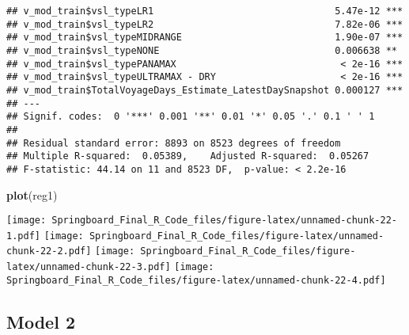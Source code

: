 \documentclass[]{article}
\newenvironment{Shaded}{\begin{snugshade}}{\end{snugshade}}
\newcommand{\KeywordTok}[1]{\textcolor[rgb]{0.13,0.29,0.53}{\textbf{#1}}}
\newcommand{\StringTok}[1]{\textcolor[rgb]{0.31,0.60,0.02}{#1}}
\newcommand{\CommentTok}[1]{\textcolor[rgb]{0.56,0.35,0.01}{\textit{#1}}}
\newcommand{\OperatorTok}[1]{\textcolor[rgb]{0.81,0.36,0.00}{\textbf{#1}}}
\newcommand{\NormalTok}[1]{#1}
\begin{document}
\begin{verbatim}
## v_mod_train$vsl_typeLR1                                5.47e-12 ***
## v_mod_train$vsl_typeLR2                                7.82e-06 ***
## v_mod_train$vsl_typeMIDRANGE                           1.90e-07 ***
## v_mod_train$vsl_typeNONE                               0.006638 ** 
## v_mod_train$vsl_typePANAMAX                             < 2e-16 ***
## v_mod_train$vsl_typeULTRAMAX - DRY                      < 2e-16 ***
## v_mod_train$TotalVoyageDays_Estimate_LatestDaySnapshot 0.000127 ***
## ---
## Signif. codes:  0 '***' 0.001 '**' 0.01 '*' 0.05 '.' 0.1 ' ' 1
## 
## Residual standard error: 8893 on 8523 degrees of freedom
## Multiple R-squared:  0.05389,    Adjusted R-squared:  0.05267 
## F-statistic: 44.14 on 11 and 8523 DF,  p-value: < 2.2e-16
\end{verbatim}

\begin{Shaded}
\begin{Highlighting}[]
\KeywordTok{plot}\NormalTok{(reg1)}
\end{Highlighting}
\end{Shaded}

\texttt{[image: Springboard\_Final\_R\_Code\_files/figure-latex/unnamed-chunk-22-1.pdf]}
\texttt{[image: Springboard\_Final\_R\_Code\_files/figure-latex/unnamed-chunk-22-2.pdf]}
\texttt{[image: Springboard\_Final\_R\_Code\_files/figure-latex/unnamed-chunk-22-3.pdf]}
\texttt{[image: Springboard\_Final\_R\_Code\_files/figure-latex/unnamed-chunk-22-4.pdf]}

\subsection{Model 2}\label{model-2}

\begin{Shaded}
\end{Shaded}
\end{document}
